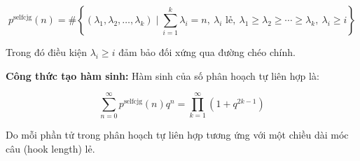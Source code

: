 \documentclass{article}
\begin{document}
\begin{itemize}
		\[
		p^{\text{selfcjg}}(n) = \# \left\{ (\lambda_1, \lambda_2, \dots, \lambda_k) \mid \sum_{i=1}^k \lambda_i = n,\ \lambda_i \text{ lẻ},\ \lambda_1 \geq \lambda_2 \geq \cdots \geq \lambda_k,\ \lambda_i \geq i \right\}
		\]
		
		Trong đó điều kiện \( \lambda_i \geq i \) đảm bảo đối xứng qua đường chéo chính.
		
		\textbf{Công thức tạo hàm sinh:} Hàm sinh của số phân hoạch tự liên hợp là:
		
		\[
		\sum_{n=0}^\infty p^{\text{selfcjg}}(n) q^n = \prod_{k=1}^\infty (1 + q^{2k-1})
		\]
		
		Do mỗi phần tử trong phân hoạch tự liên hợp tương ứng với một chiều dài móc câu (hook length) lẻ.
		
		
	\end{itemize}
	
\end{document}
